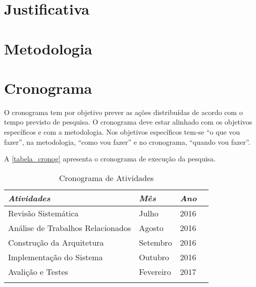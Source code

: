 \documentclass[
	12pt,				%
	openright,			%
	oneside,
	a4paper,			%
	english,			%
	french,				%
	spanish,			%
	brazil,				%
	]{abntex2}
\begin{document}

\chapter{Justificativa}

\lipsum



\chapter{Metodologia}

\lipsum


\chapter{Cronograma}

O cronograma tem por objetivo prever as ações distribuídas de acordo com o tempo previsto de pesquisa. O cronograma deve estar alinhado com os objetivos específicos e com a metodologia. Nos objetivos específicos tem-se “o que vou fazer”, na metodologia, “como vou fazer” e no cronograma, “quando vou fazer”.

A  \autoref{tabela_cronog} apresenta o cronograma de execução da pesquisa. 

\begin{table}[!htb]
\centering
\caption{Cronograma de Atividades}
\label{tabela_cronog}
\begin{tabular}{@{}llll@{}}
\toprule
\textit{Atividades}                  & \textit{Mês}       & \textit{Ano}   \\ \midrule
Revisão Sistemática                  & Julho              & 2016      \\
Análise de Trabalhos Relacionados    & Agosto             & 2016      \\
Construção da Arquitetura            & Setembro           & 2016      \\
Implementação do Sistema             & Outubro            & 2016      \\
Avalição e Testes                    & Fevereiro          & 2017      \\
                                     &                    &           \\ \bottomrule
\end{tabular}
\end{table}
\end{document}
